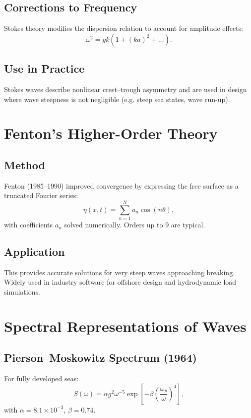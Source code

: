 \documentclass[11pt,a4paper]{article}
\begin{document}
\subsection{Corrections to Frequency}
Stokes theory modifies the dispersion relation to account for amplitude effects:
\begin{equation}
\omega^2 = gk\left(1 + (ka)^2 + \dots \right).
\end{equation}

\subsection{Use in Practice}
Stokes waves describe nonlinear crest–trough asymmetry and are used in design where wave steepness is not negligible (e.g. steep sea states, wave run-up).

\section{Fenton’s Higher-Order Theory}
\subsection{Method}
Fenton (1985–1990) improved convergence by expressing the free surface as a truncated Fourier series:
\begin{equation}
\eta(x,t) = \sum_{n=1}^{N} a_n \cos(n\theta),
\end{equation}
with coefficients $a_n$ solved numerically. Orders up to 9 are typical.

\subsection{Application}
This provides accurate solutions for very steep waves approaching breaking. Widely used in industry software for offshore design and hydrodynamic load simulations.

\section{Spectral Representations of Waves}
\subsection{Pierson–Moskowitz Spectrum (1964)}
For fully developed seas:
\begin{equation}
S(\omega) = \alpha g^2 \omega^{-5} \exp\left[-\beta\left(\frac{\omega_p}{\omega}\right)^4\right],
\end{equation}
with $\alpha = 8.1\times10^{-3}$, $\beta=0.74$.
\end{document}
